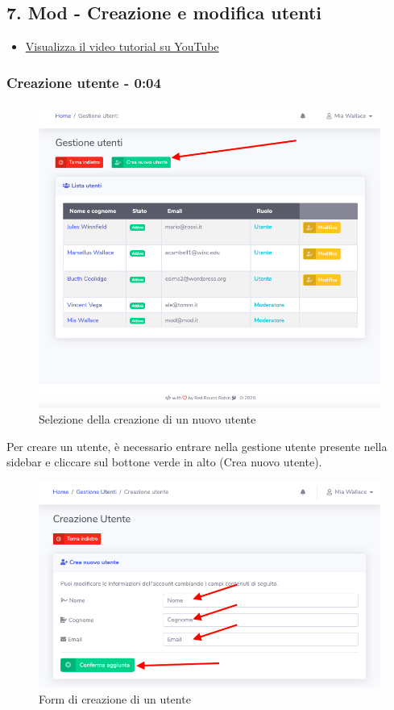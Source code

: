 \newpage \subsection{7. Mod - Creazione e modifica utenti}

	\begin{itemize}
		\item \href{https://www.youtube.com/watch?v=PjySMOLCtMA&list=PLPKYjnuIh1FA3b3jn_bwY_ztYzaFn2mIT&index=10}{Visualizza il video tutorial su YouTube} 
	\end{itemize}

	\subsubsection{Creazione utente - 0:04}
		\begin{figure}[H]
		\centering
		\includegraphics[scale=0.600]{res/images/mod/selCreazUtenti.png}
		\caption{Selezione della creazione di un nuovo utente}
	\end{figure}
		Per creare un utente, è necessario entrare nella gestione utente presente nella sidebar e cliccare sul bottone verde in alto (Crea nuovo utente).
		\begin{figure}[H]
		\centering
		\includegraphics[scale=0.600]{res/images/mod/creazUtente.png}
		\caption{Form di creazione di un utente}
	\end{figure}
